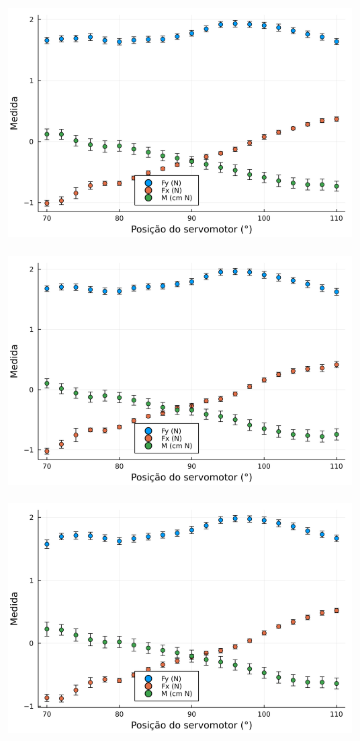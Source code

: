 \begin{figure}[htbp]
    \centering
    \begin{subfigure}{0.49\textwidth}
        \includegraphics[width=\textwidth]{img/results/exp7_5bar_70_a_110.png}
    \end{subfigure}
    \begin{subfigure}{0.49\textwidth}
        \includegraphics[width=\textwidth]{img/results/exp8_5bar_110_a_70.png}
    \end{subfigure}
    \begin{subfigure}{0.49\textwidth}
        \includegraphics[width=\textwidth]{img/results/exp9_5bar_70_a_110.png}

\end{subfigure}
\end{figure}
